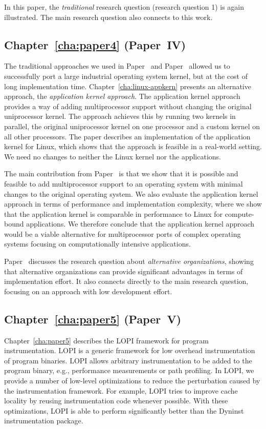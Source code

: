 In this paper, the \emph{traditional} research question (research question 1)
is again illustrated. The main research question also connects to this work.

\subsection{Chapter~\ref{cha:paper4} (Paper~IV)}
The traditional approaches we used in Paper~ and
Paper~ allowed us to successfully port a large industrial
operating system kernel, but at the cost of long implementation time.
Chapter~\ref{cha:linux-appkern} presents an alternative approach, the
\emph{application kernel approach}. The application kernel approach provides a
way of adding multiprocessor support without changing the original
uniprocessor kernel. The approach achieves this by running two kernels in
parallel, the original uniprocessor kernel on one processor and a custom
kernel on all other processors. The paper describes an implementation of the
application kernel for Linux, which shows that the approach is feasible in a
real-world setting. We need no changes to neither the Linux kernel nor the
applications.

The main contribution from Paper~ is that we show that
it is possible and feasible to add multiprocessor support to an operating
system with minimal changes to the original operating system. We also evaluate
the application kernel approach in terms of performance and implementation
complexity, where we show that the application kernel is comparable in
performance to Linux for compute-bound applications. We therefore conclude
that the application kernel approach would be a viable alternative for
multiprocessor ports of complex operating systems focusing on computationally
intensive applications.

Paper~ discusses the research question about
\emph{alternative organizations}, showing that alternative organizations can
provide significant advantages in terms of implementation effort. It also
connects directly to the main research question, focusing on an approach with
low development effort.

\subsection{Chapter~\ref{cha:paper5} (Paper~V)}
Chapter~\ref{cha:paper5} describes the LOPI framework for program
instrumentation. LOPI is a generic framework for low overhead instrumentation
of program binaries.  LOPI allows arbitrary instrumentation to be added to the
program binary, e.g., performance measurements or path profiling. In LOPI, we
provide a number of low-level optimizations to reduce the perturbation caused
by the instrumentation framework. For example, LOPI tries to improve cache
locality by reusing instrumentation code whenever possible. With these
optimizations, LOPI is able to perform significantly better than the
Dyninst~\cite{buck00dyninst} instrumentation package.


